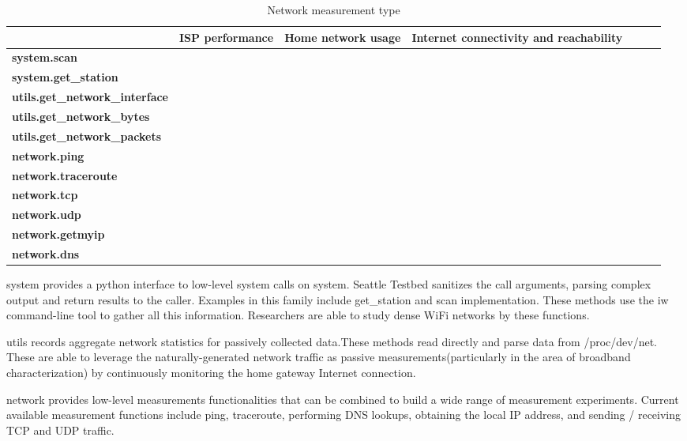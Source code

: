 \begin{table*} %
\scriptsize
\centering
\begin{tabular}{|l|c|c|c|c|c|c|}
\hline
\textbf{}    &  \textbf{ISP performance} & \textbf{Home network usage}  & \textbf{Internet connectivity and reachability}\\
 \hline
 {\bf system.scan} & {\bf *} & {\bf } & {\bf }\\
\hline
 {\bf system.get\_station} & {\bf *} & {\bf *} & {\bf }\\
\hline
 {\bf utils.get\_network\_interface} & {\bf *} & {\bf } & {\bf }\\
\hline
 {\bf utils.get\_network\_bytes} & {\bf *} & {\bf } & {\bf }\\
\hline
 {\bf utils.get\_network\_packets} & {\bf *} & {\bf } & {\bf *}\\
\hline
 {\bf network.ping} & {\bf *} & {\bf } & {\bf *}\\
\hline
 {\bf network.traceroute} & {\bf } & {\bf } & {\bf *}\\
\hline
 {\bf network.tcp} & {\bf *} & {\bf } & {\bf *}\\
\hline
 {\bf network.udp} & {\bf *} & {\bf *} & {\bf }\\
\hline
 {\bf network.getmyip} & {\bf *} & {\bf *} & {\bf *} \\
\hline
 {\bf network.dns} & {\bf *} & {\bf } & {\bf *}\\
\hline
\end{tabular}
\caption {Network measurement type}
\label{table:type}
\end{table*}

system provides a python interface to low-level system calls on system. Seattle Testbed sanitizes the call arguments, parsing complex output and return results to the caller. Examples in this family include get\_station and scan implementation. These methods use the iw command-line tool to gather all this information. Researchers are able to study dense WiFi networks by these functions.

utils records aggregate network statistics for passively collected data.These methods read directly and parse data from /proc/dev/net. These are able to leverage the naturally-generated network traffic as passive measurements(particularly in the area of broadband characterization) by continuously monitoring the home gateway Internet connection.

network provides low-level measurements functionalities that can be combined to build a wide range of measurement experiments. Current available measurement functions include ping, traceroute, performing DNS lookups, obtaining the local IP address, and sending / receiving TCP and UDP traffic.

